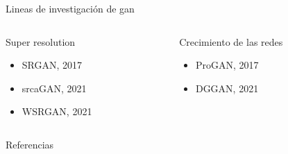 \begin{frame}{Lineas de investigación de \gls{gan}}

    \begin{columns}[T]
    \begin{column}{0.48\textwidth}
    \alert{\Large Super resolution}
    \begin{itemize}
        \item SRGAN, 2017\cite{ledig2017photo}
        \item srcaGAN, 2021\cite{liu2021super}
        \item WSRGAN, 2021\cite{cao2021weighted}
    \end{itemize}
    \end{column}
    \hfill
    
    \begin{column}{.48\textwidth}
    \alert{\Large Crecimiento de las redes}
    \begin{itemize}
        \item ProGAN, 2017\cite{karras2017progressive}
        \item DGGAN, 2021\cite{liu2021dynamically}
    \end{itemize}
    \end{column}
    \end{columns}
    
\end{frame}


\begin{frame}[allowframebreaks]{Referencias}
    
    
\end{frame}

